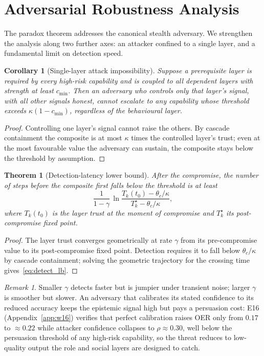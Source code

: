\documentclass[sigconf,anonymous]{acmart}
\theoremstyle{plain}
\newtheorem{theorem}{Theorem}
\newtheorem{corollary}{Corollary}
\theoremstyle{definition}
\theoremstyle{remark}
\newtheorem{remark}{Remark}
\begin{document}
\section{Adversarial Robustness Analysis}
\label{sec:robustness}
The paradox theorem addresses the canonical stealth adversary. We strengthen the analysis
along two further axes: an attacker confined to a single layer, and a fundamental limit on
detection speed.

\begin{corollary}[Single-layer attack impossibility]
\label{cor:singlelayer}
Suppose a prerequisite layer is required by every high-risk capability and is coupled to all
dependent layers with strength at least $c_{\min}$. Then an adversary who controls only that
layer's signal, with all other signals honest, cannot escalate to any capability whose
threshold exceeds $\kappa(1-c_{\min})$, regardless of the behavioural layer.
\end{corollary}
\begin{proof}
Controlling one layer's signal cannot raise the others. By cascade containment the composite
is at most $\kappa$ times the controlled layer's trust; even at the most favourable value the
adversary can sustain, the composite stays below the threshold by assumption.
\end{proof}

\begin{theorem}[Detection-latency lower bound]
\label{thm:detection}
After the compromise, the number of steps before the composite first falls below the
threshold is at least
\begin{equation}
\frac{1}{1-\gamma}\,\ln\!\frac{T_k(t_0)-\theta_c/\kappa}{T_k^\star-\theta_c/\kappa},
\label{eq:detect_lb}
\end{equation}
where $T_k(t_0)$ is the layer trust at the moment of compromise and $T_k^\star$ its
post-compromise fixed point.
\end{theorem}
\begin{proof}
The layer trust converges geometrically at rate $\gamma$ from its pre-compromise value to its
post-compromise fixed point. Detection requires it to fall below $\theta_c/\kappa$ by
cascade containment; solving the geometric trajectory for the crossing time
gives~\eqref{eq:detect_lb}.
\end{proof}

\begin{remark}
Smaller $\gamma$ detects faster but is jumpier under transient noise; larger $\gamma$ is
smoother but slower. An adversary that calibrates its stated confidence to its reduced
accuracy keeps the epistemic signal high but pays a persuasion cost: E16
(Appendix~\ref{app:w16}) verifies that perfect calibration raises OER only from $0.17$ to
$\approx\!0.22$ while attacker confidence collapses to $\rho\!\approx\!0.30$, well below
the persuasion threshold of any high-risk capability, so the threat reduces to
low-quality output the role and social layers are designed to catch.
\end{remark}
\end{document}
